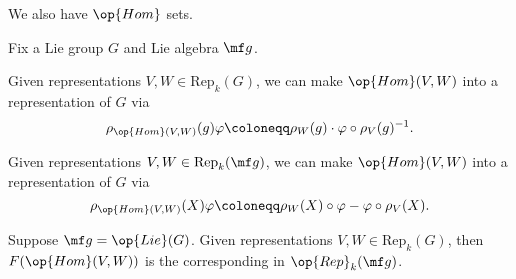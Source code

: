 \documentclass[../notes.tex]{subfiles}
\begin{document}
We also have $\op{Hom}$ sets.
\begin{lemma} \label{lem:internal-hom-rep-theory}
	Fix a Lie group $G$ and Lie algebra $\mf g$.
	\begin{listalph}
		\item Given representations $V,W\in\mathrm{Rep}_k(G)$, we can make $\op{Hom}(V,W)$ into a representation of $G$ via
		\[\rho_{\op{Hom}(V,W)}(g)\varphi\coloneqq\rho_W(g)\cdot\varphi\circ\rho_V(g)^{-1}.\]
		\item Given representations $V,W\in\mathrm{Rep}_k(\mf g)$, we can make $\op{Hom}(V,W)$ into a representation of $G$ via
		\[\rho_{\op{Hom}(V,W)}(X)\varphi\coloneqq\rho_W(X)\circ\varphi-\varphi\circ\rho_V(X).\]
		\item Suppose $\mf g=\op{Lie}(G)$. Given representations $V,W\in\mathrm{Rep}_k(G)$, then $F(\op{Hom}(V,W))$ is the corresponding in $\op{Rep}_k(\mf g)$.
	\end{listalph}
\end{lemma}
\end{document}
